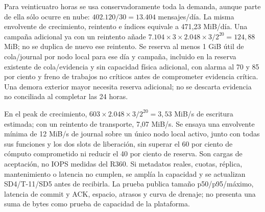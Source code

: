Para veinticuatro horas se usa conservadoramente toda la demanda, aunque parte de ella sólo ocurre en nube: $402.120/30=13.404$ mensajes/día. La misma envolvente de crecimiento, reintento e índices equivale a 471,23 MiB/día. Una campaña adicional ya con un reintento añade $7.104\times3\times2.048\times3/2^{20}=124,88$ MiB; no se duplica de nuevo ese reintento. Se reserva al menos 1 GiB útil de cola/journal por nodo local para ese día y campaña, incluido en la reserva existente de cola/evidencia y sin capacidad física adicional, con alarma al 70 y 85 por ciento y freno de trabajos no críticos antes de comprometer evidencia crítica. Una demora exterior mayor necesita reserva adicional; no se descarta evidencia no conciliada al completar las 24 horas.

En el peak de crecimiento, $603\times2.048\times3/2^{20}=3,53$ MiB/s de escritura estimada; con un reintento de transporte, 7,07 MiB/s. Se ensaya una envolvente mínima de 12 MiB/s de journal sobre un único nodo local activo, junto con todas sus funciones y los dos slots de liberación, sin superar el 60 por ciento de cómputo comprometido ni reducir el 40 por ciento de reserva. Son cargas de aceptación, no IOPS medidas del R360. Si metadatos reales, cuotas, réplica, mantenimiento o latencia no cumplen, se amplía la capacidad y se actualizan SD4/T-11/SD5 antes de recibirla. La prueba publica tamaño p50/p95/máximo, latencia de commit y ACK, espacio, atrasos y curva de drenaje; no presenta una suma de bytes como prueba de capacidad de la plataforma.
